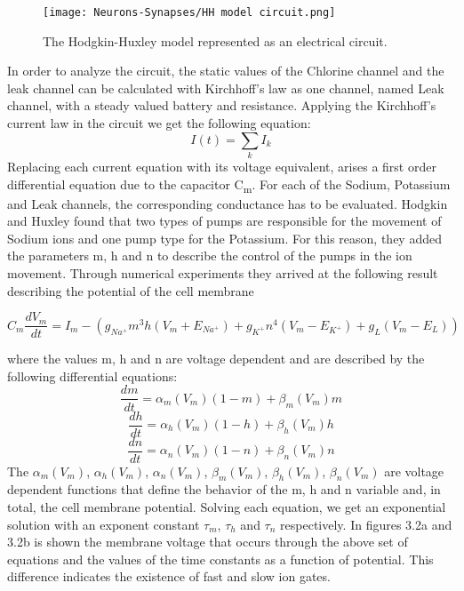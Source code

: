 \documentclass[12pt]{report}
\begin{document}
\begin{figure}[htp]
    \centering
    \texttt{[image: Neurons-Synapses/HH model circuit.png]}
    \caption{The Hodgkin-Huxley model represented as an electrical circuit.}
    \label{fig:neurons-multipolar}
\end{figure}

In order to analyze the circuit, the static values of the Chlorine channel and the leak channel can be calculated with Kirchhoff's law as one channel, named Leak channel, with a steady valued battery and resistance. Applying the Kirchhoff's current law in the circuit we get the following equation: \[I(t) = \sum_{k}I_k\]
Replacing each current equation with its voltage equivalent, arises a first order differential equation due to the capacitor C\textsubscript{m}. For each of the Sodium, Potassium and Leak channels, the corresponding conductance has to be evaluated. Hodgkin and Huxley found that two types of pumps are responsible for the movement of Sodium ions and one pump type for the Potassium. For this reason, they added the parameters m, h and n to describe the control of the pumps in the ion movement. Through numerical experiments they arrived at the following result describing the potential of the cell membrane

\begin{equation}
C_m\frac{dV_m}{dt} = I_m - (g_{Na^+}m^3h(V_m+E_{Na^+}) + g_{K^+}n^4(V_m-E_{K^+}) + g_L(V_m-E_L))
\end{equation}


where the values m, h and n are voltage dependent and are described by the following differential equations:
\begin{equation}
\frac{dm}{dt}=\alpha_m(V_m)(1-m)+\beta_m(V_m)m
\end{equation}
\begin{equation}
\frac{dh}{dt}=\alpha_h(V_m)(1-h)+\beta_h(V_m)h
\end{equation}
\begin{equation}
\frac{dn}{dt}=\alpha_n(V_m)(1-n)+\beta_n(V_m)n
\end{equation}
The \(\alpha_m(V_m)\), \(\alpha_h(V_m)\), \(\alpha_n(V_m)\), \(\beta_m(V_m)\), \(\beta_h(V_m)\), \(\beta_n(V_m)\) are voltage dependent functions that define the behavior of the m, h and n variable and, in total, the cell membrane potential. Solving each equation, we get an exponential solution with an exponent constant \(\tau_m\), \(\tau_h\) and \(\tau_n\) respectively. In figures 3.2a and 3.2b is shown the membrane voltage that occurs through the above set of equations and the values of the time constants as a function of potential. This difference indicates the existence of fast and slow ion gates.
\end{document}
